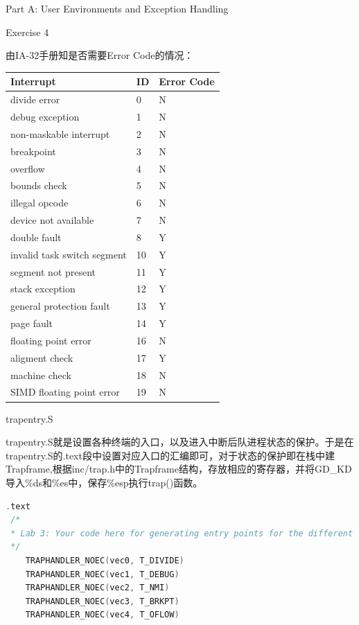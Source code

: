 \documentclass[GBK,winfonts,a4paper,10pt]{ctexart}
\begin{document}
\begin{section}{ Part A: User Environments and Exception Handling }
\begin{subsection}{ Exercise 4 }
\par
由IA-32手册知是否需要Error Code的情况：
\begin{center}
    \begin{tabular}{ | l | l | l |}
    \hline
Interrupt   &   ID   &   Error Code  \\ \hline
divide error	&	0	&	N	\\ \hline 				
debug exception &  1  & N	\\ \hline 
non-maskable interrupt	&	2	&	N	\\ \hline 
breakpoint	&	3	&	N	\\ \hline 
overflow		&	4	&	N	\\ \hline 
bounds check		&	5	&	N	\\ \hline 
illegal opcode	&	6	&	N	\\ \hline 
device not available		&	7	&	N	\\ \hline 
double fault				&	8	&   Y	\\ \hline 
invalid task switch segment	&	10	&	Y	\\ \hline 
segment not present	&	11	&	Y	\\ \hline 
stack exception	&	12	&	Y	\\ \hline 
general protection fault	&	13	&	Y	\\ \hline 
page fault	&	14	&	Y	\\ \hline 
floating point error	&	16	&	N	\\ \hline 
aligment check	&	17	&	Y		\\ \hline 
machine check		&	18	&	N	\\ \hline 
SIMD floating point error		&	19	&	N	\\ \hline
    \end{tabular}
\end{center}

\begin{subsubsection}{ trapentry.S }
\par
trapentry.S就是设置各种终端的入口，以及进入中断后队进程状态的保护。于是在trapentry.S的.text段中设置对应入口的汇编即可，对于状态的保护即在栈中建Trapframe,根据inc/trap.h中的Trapframe结构，存放相应的寄存器，并将GD\_KD导入\%ds和\%es中，保存\%esp执行trap()函数。
\begin{lstlisting}[language=C]
.text
 /*
 * Lab 3: Your code here for generating entry points for the different traps.
 */
 	TRAPHANDLER_NOEC(vec0, T_DIVIDE)
 	TRAPHANDLER_NOEC(vec1, T_DEBUG)
 	TRAPHANDLER_NOEC(vec2, T_NMI)
 	TRAPHANDLER_NOEC(vec3, T_BRKPT)
 	TRAPHANDLER_NOEC(vec4, T_OFLOW)


\end{lstlisting}
\end{subsubsection}
\end{subsection}
\end{section}
\end{document}
